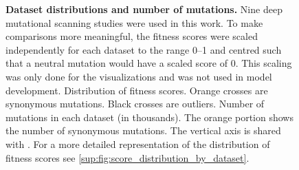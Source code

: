 \begin{figure}[!htb]
	\ffigbox{%
		\begin{subfloatrow}
			\ffigbox[\FBwidth]{}{\caption{}\label{subfig:fitness_score_distribution}}%
			\ffigbox[\FBwidth]{}{\caption{}\label{subfig:datasets_abundancies}}%
		\end{subfloatrow}%
	}
	{\caption[Dataset distributions and number of mutations]{%
			\textbf{Dataset distributions and number of mutations.} Nine deep mutational scanning studies were used in this work.
			To make comparisons more meaningful, the fitness scores were scaled independently for each dataset to the range \numrange{0}{1} and centred such that a neutral mutation would have a scaled score of \num{0}.
			This scaling was only done for the visualizations and was not used in model development.
			 Distribution of fitness scores.
			Orange crosses are synonymous mutations. Black crosses are outliers.
			 Number of mutations in each dataset (in thousands).
			The orange portion shows the number of synonymous mutations.
			The vertical axis is shared with .
			For a more detailed representation of the distribution of fitness scores see \cref{sup:fig:score_distribution_by_dataset}.
		}}
\end{figure}

